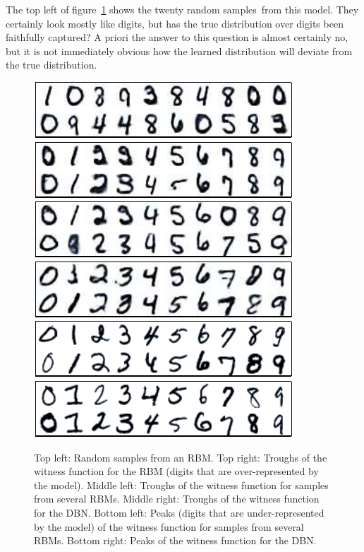 \documentclass{article} %
\begin{document}
The top left of figure~\ref{fig:digits} shows the twenty random samples\footnotemark~from this model.
They certainly look mostly like digits, but has the true distribution over digits been faithfully captured?
A priori the answer to this question is almost certainly no, but it is not immediately obvious how the learned distribution will deviate from the true distribution.

\begin{figure}[ht]
\centering
\includegraphics[width=0.48\columnwidth]{figures/rbm_samples}
\includegraphics[width=0.48\columnwidth]{figures/rbm_witness_troughs}
\\
\includegraphics[width=0.48\columnwidth]{figures/many_rbm_cond_witness_troughs}
\includegraphics[width=0.48\columnwidth]{figures/dbn_ft_cond_witness_troughs}
\\
\includegraphics[width=0.48\columnwidth]{figures/many_rbm_cond_witness_peaks}
\includegraphics[width=0.48\columnwidth]{figures/dbn_ft_cond_witness_peaks}
\caption{
Top left: Random samples from an RBM.
Top right: Troughs of the witness function for the RBM (digits that are over-represented by the model).
Middle left: Troughs of the witness function for samples from several RBMs.
Middle right: Troughs of the witness function for the DBN.
Bottom left: Peaks (digits that are under-represented by the model) of the witness function for samples from several RBMs.
Bottom right: Peaks of the witness function for the DBN.
}
\label{fig:digits}
\end{figure}
\end{document}
